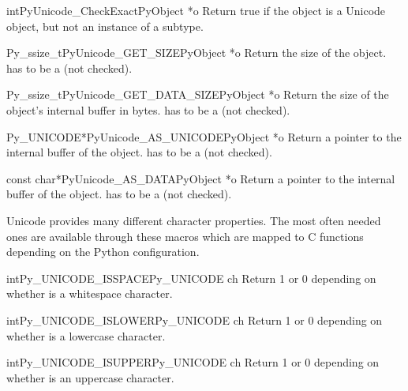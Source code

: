 \begin{cfuncdesc}{int}{PyUnicode_CheckExact}{PyObject *o}
  Return true if the object  is a Unicode object, but not an
  instance of a subtype.
\end{cfuncdesc}

\begin{cfuncdesc}{Py_ssize_t}{PyUnicode_GET_SIZE}{PyObject *o}
  Return the size of the object.   has to be a
   (not checked).
\end{cfuncdesc}

\begin{cfuncdesc}{Py_ssize_t}{PyUnicode_GET_DATA_SIZE}{PyObject *o}
  Return the size of the object's internal buffer in bytes.  
  has to be a  (not checked).
\end{cfuncdesc}

\begin{cfuncdesc}{Py_UNICODE*}{PyUnicode_AS_UNICODE}{PyObject *o}
  Return a pointer to the internal  buffer of the
  object.   has to be a  (not checked).
\end{cfuncdesc}

\begin{cfuncdesc}{const char*}{PyUnicode_AS_DATA}{PyObject *o}
  Return a pointer to the internal buffer of the object.
   has to be a  (not checked).
\end{cfuncdesc}


Unicode provides many different character properties. The most often
needed ones are available through these macros which are mapped to C
functions depending on the Python configuration.

\begin{cfuncdesc}{int}{Py_UNICODE_ISSPACE}{Py_UNICODE ch}
  Return 1 or 0 depending on whether  is a whitespace
  character.
\end{cfuncdesc}

\begin{cfuncdesc}{int}{Py_UNICODE_ISLOWER}{Py_UNICODE ch}
  Return 1 or 0 depending on whether  is a lowercase character.
\end{cfuncdesc}

\begin{cfuncdesc}{int}{Py_UNICODE_ISUPPER}{Py_UNICODE ch}
  Return 1 or 0 depending on whether  is an uppercase
  character.
\end{cfuncdesc}

